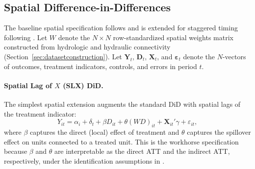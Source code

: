 \documentclass[11pt, letterpaper]{article}
\begin{document}
\subsection{Spatial Difference-in-Differences}
\label{sec:sdid}

The baseline spatial specification follows \citet{delgado2015did} and is extended for staggered timing following \citet{butts2023did}. Let $W$ denote the $N \times N$ row-standardized spatial weights matrix constructed from hydrologic and hydraulic connectivity (Section~\ref{sec:datasetconstruction}). Let $\mathbf{Y}_t$, $\mathbf{D}_t$, $\mathbf{X}_t$, and $\boldsymbol{\varepsilon}_t$ denote the $N$-vectors of outcomes, treatment indicators, controls, and errors in period $t$.

\paragraph{Spatial Lag of $X$ (SLX) DiD.} The simplest spatial extension augments the standard DiD with spatial lags of the treatment indicator:
\begin{equation}
Y_{it} = \alpha_i + \delta_t + \beta D_{it} + \theta (WD)_{it} + \mathbf{X}_{it}'\gamma + \varepsilon_{it},
\label{eq:slx}
\end{equation}
where $\beta$ captures the direct (local) effect of treatment and $\theta$ captures the spillover effect on units connected to a treated unit. This is the workhorse specification because $\beta$ and $\theta$ are interpretable as the direct ATT and the indirect ATT, respectively, under the identification assumptions in \citet{butts2023did}.
\end{document}
